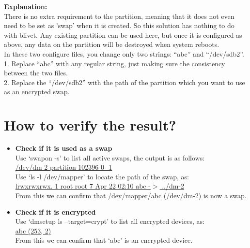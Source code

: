 \documentclass{article}
\begin{document}
\textbf{Explanation:}\\

There is no extra requirement to the partition, meaning that it does not even
need to be set as 'swap' when it is created. So this solution has nothing to do
with blivet. Any existing partition can be used here, but once it is configured
as above, any data on the partition will be destroyed when system reboots.\\

In these two configure files, you change only two strings: ``abc'' and
``/dev/sdb2''.\\

1. Replace ``abc'' with any regular string, just making sure the consistency
between the two files.\\

2. Replace the ``/dev/sdb2'' with the path of the partition which you want to use
as an encrypted swap.

\section{How to verify the result?}

\begin{itemize}
\item \textbf{Check if it is used as a swap}\\

Use `swapon -s' to list all active swaps, the output is as follows:\\

\underline{	/dev/dm-2		partition	102396	0	-1}\\

Use `ls -l /dev/mapper' to locate the path of the swap, as:\\

\underline{	lrwxrwxrwx. 1 root root       7 Apr 22 02:10 abc -$>$ ../dm-2}\\

From this we can confirm that /dev/mapper/abc (/dev/dm-2) is now a swap.\\

\item \textbf{Check if it is encrypted}\\

Use `dmsetup ls --target=crypt' to list all encrypted devices, as:\\

\underline{	abc	(253, 2)}\\

From this we can confirm that `abc' is an encrypted device.
\end{itemize}
\end{document}
